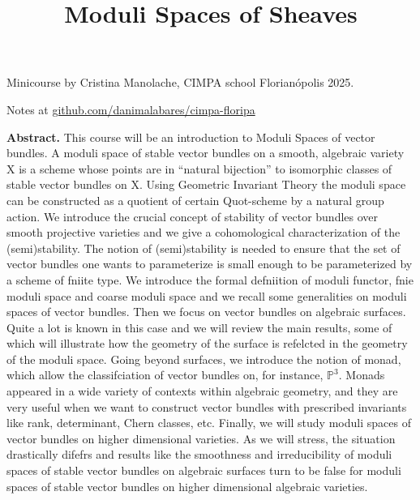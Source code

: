 


\title{Moduli Spaces of Sheaves}
\maketitle

Minicourse by Cristina Manolache, CIMPA
school Florian\'opolis 2025.

Notes at
\href{%
http://github.com/danimalabares/cimpa-floripa
}{%
github.com/danimalabares/cimpa-floripa
}

\bigskip\noindent

{\bf Abstract.} This course will be an
introduction to Moduli Spaces of vector
bundles. A moduli space of stable vector
bundles on a smooth, algebraic variety X is a
scheme whose points are in ``natural
bijection'' to isomorphic classes of stable
vector bundles on X. Using Geometric
Invariant Theory the moduli space can be
constructed as a quotient of certain
Quot-scheme by a natural group action. We
introduce the crucial concept of stability of
vector bundles over smooth projective
varieties and we give a cohomological
characterization of the (semi)stability. The
notion of (semi)stability is needed to ensure
that the set of vector bundles one wants to
parameterize is small enough to be
parameterized by a scheme of fniite type. We
introduce the formal defniition of moduli
functor, fnie moduli space and coarse moduli
space and we recall some generalities on
moduli spaces of vector bundles. Then we
focus on vector bundles on algebraic
surfaces. Quite a lot is known in this case
and we will review the main results, some of
which will illustrate how the geometry of the
surface is refelcted in the geometry of the
moduli space. Going beyond surfaces, we
introduce the notion of monad, which allow
the classifciation of vector bundles on, for
instance, $\mathbb{P}^3$. Monads appeared in
a wide variety of contexts within algebraic
geometry, and they are very useful when we
want to construct vector bundles with
prescribed invariants like rank, determinant,
Chern classes, etc.  Finally, we will study
moduli spaces of vector bundles on higher
dimensional varieties. As we will stress, the
situation drastically difefrs and results
like the smoothness and irreducibility of
moduli spaces of stable vector bundles on
algebraic surfaces turn to be false for
moduli spaces of stable vector bundles on
higher dimensional algebraic varieties.

\bigskip\noindent
\tableofcontents

\bigskip\noindent

